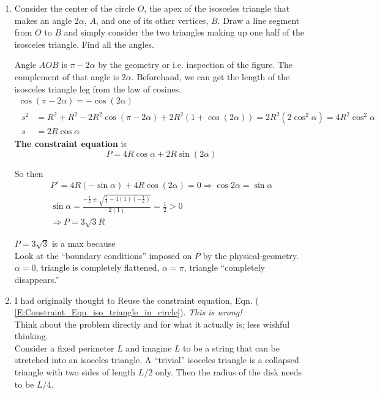 \documentclass[twoside]{amsart}
\theoremstyle{plain}
\theoremstyle{definition}
\newcommand{\exercisehead}[1]
  {\smallskip
   \noindent{\small\bf Exercise #1.}}
\begin{document}
\exercisehead{22} \begin{enumerate}
\item Consider the center of the circle $O$, the apex of the isosceles triangle that makes an angle $2\alpha$, $A$, and one of its other vertices, $B$.  Draw a line segment from $O$ to $B$ and simply consider the two triangles making up one half of the isosceles triangle.  Find all the angles.  

Angle $AOB$ is $\pi - 2\alpha$ by the geometry or i.e. inspection of the figure.  The complement of that angle is $2\alpha$.  Beforehand, we can get the length of the isosceles triangle leg from the law of cosines.  
\[
\begin{gathered}
  \cos{ (\pi - 2\alpha ) } = - \cos{ (2\alpha)} \\
  \begin{aligned}
    s^2 & = R^2 + R^2 -2R^2 \cos{ (\pi - 2\alpha)} + 2R^2 (1+ \cos{ (2\alpha) } ) = 2R^2 ( 2\cos^2{\alpha}) = 4R^2 \cos^2{\alpha} \\
    s & = 2R \cos{\alpha} 
  \end{aligned}
\end{gathered}
\]
\textbf{ The constraint equation } is
\begin{equation}\label{E:Constraint_Eqn_iso_triangle_in_circle}
  P = 4R \cos{\alpha} + 2R \sin{(2\alpha) } 
\end{equation}

So then
\[
\begin{gathered}
  P' = 4R ( -\sin{\alpha} ) + 4R \cos{(2\alpha) } = 0  \Longrightarrow \cos{2\alpha} = \sin{\alpha} \\
  \sin{\alpha} = \frac{ -\frac{1}{2} \pm \sqrt{ \frac{1}{4} - 4(1)(-\frac{1}{2} ) } }{ 2(1) } = \frac{1}{2} > 0 \\
  \Longrightarrow \boxed{ P = 3\sqrt{3} R }
\end{gathered}
\]

$P = 3 \sqrt{3}$ is a max because \medskip \\
\quad Look at the ``boundary conditions'' imposed on $P$  by the physical-geometry.  $\alpha =0$, triangle is completely flattened, $\alpha= \pi$, triangle ``completely disappears.''
\item I had originally thought to Reuse the constraint equation, Eqn. ( \ref{E:Constraint_Eqn_iso_triangle_in_circle}).  \emph{ This is wrong!} \medskip \\
Think about the problem directly and for what it actually is; less wishful thinking.  \\
Consider a fixed perimeter $L$ and imagine $L$ to be a string that can be stretched into an isoceles triangle.  A ``trivial'' isoceles triangle is a collapsed triangle with two sides of length $L/2$ only.  Then the radius of the disk needs to be $L/4$.   \bigskip \\


\end{enumerate}
\end{document}
